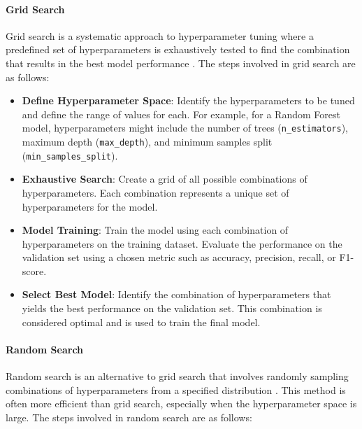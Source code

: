 \paragraph{Grid Search}

Grid search is a systematic approach to hyperparameter tuning where a predefined set of hyperparameters is exhaustively tested to find the combination that results in the best model performance \cite{bergstra2011algorithms}. The steps involved in grid search are as follows:

\begin{itemize}
    \item \textbf{Define Hyperparameter Space}: Identify the hyperparameters to be tuned and define the range of values for each. For example, for a Random Forest model, hyperparameters might include the number of trees (\texttt{n\_estimators}), maximum depth (\texttt{max\_depth}), and minimum samples split (\texttt{min\_samples\_split}).
    \item \textbf{Exhaustive Search}: Create a grid of all possible combinations of hyperparameters. Each combination represents a unique set of hyperparameters for the model.
    \item \textbf{Model Training}: Train the model using each combination of hyperparameters on the training dataset. Evaluate the performance on the validation set using a chosen metric such as accuracy, precision, recall, or F1-score.
    \item \textbf{Select Best Model}: Identify the combination of hyperparameters that yields the best performance on the validation set. This combination is considered optimal and is used to train the final model.
\end{itemize}

\paragraph{Random Search}

Random search is an alternative to grid search that involves randomly sampling combinations of hyperparameters from a specified distribution \cite{bergstra2012random}. This method is often more efficient than grid search, especially when the hyperparameter space is large. The steps involved in random search are as follows:

